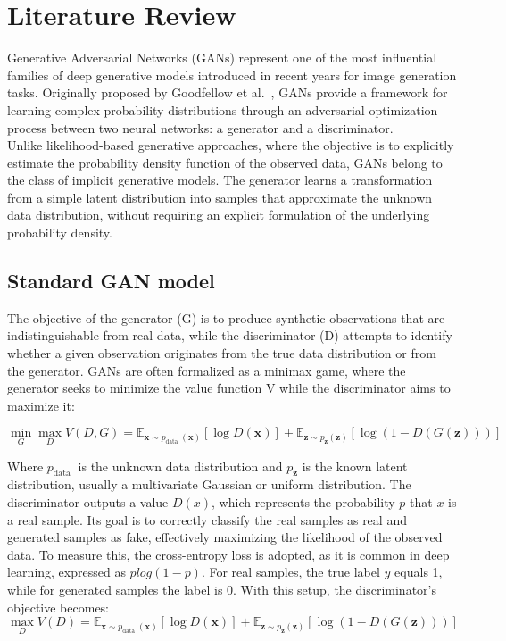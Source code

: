 \chapter{Literature Review}
\label{chapter:literature_review}

Generative Adversarial Networks (GANs) represent one of the most influential
families of deep generative models introduced in recent years for image generation tasks.
Originally proposed by Goodfellow et al.~\cite{background:gan},
GANs provide a framework for learning complex probability distributions
through an adversarial optimization process between two neural networks:
a generator and a discriminator.\\
Unlike likelihood-based generative approaches, where the objective is to
explicitly estimate the probability density function of the observed data,
GANs belong to the class of implicit generative models.
The generator learns a transformation from a simple latent distribution into
samples that approximate the unknown data distribution, without requiring an
explicit formulation of the underlying probability density.

\section{Standard GAN model}
\label{sec:gans}
The objective of the generator (G) is to produce synthetic observations that are
indistinguishable from real data, while the discriminator (D) attempts to identify
whether a given observation originates from the true data distribution or from
the generator.
GANs are often formalized as a minimax game, where the generator seeks to minimize the value function V while the discriminator
aims to maximize it:

\begin{equation}
    \label{eq:GAN minimax}
\min _G \max _D V(D, G)=\mathbb{E}_{\boldsymbol{x} \sim p_{\text {data }}(\boldsymbol{x})}[\log D(\boldsymbol{x})]+\mathbb{E}_{\boldsymbol{z} \sim p_{\boldsymbol{z}}(\boldsymbol{z})}[\log (1-D(G(\boldsymbol{z})))]
\end{equation}

Where $p_{\text {data }}$ is the unknown data distribution and $p_{\boldsymbol{z}}$ is the known latent distribution, usually a multivariate Gaussian or uniform distribution.
The discriminator outputs a value $D(x)$, 
which represents the probability $p$ that $x$ is a real sample.
Its goal is to correctly classify the real samples as real and generated samples as fake,
effectively maximizing the likelihood of the observed data.
To measure this, the cross-entropy loss is adopted, as it is common in deep learning,
expressed as $plog(1-p)$. 
For real samples, the true label $y$ equals 1, 
while for generated samples the label is 0.
With this setup, the discriminator's objective becomes:
\begin{equation}
    \label{eq:discriminator objective}
    \max _D V(D)=\mathbb{E}_{\boldsymbol{x} \sim p_{\text {data }}(\boldsymbol{x})}[\log D(\boldsymbol{x})]+\mathbb{E}_{\boldsymbol{z} \sim p_{\boldsymbol{z}}(\boldsymbol{z})}[\log (1-D(G(\boldsymbol{z})))]
\end{equation}

